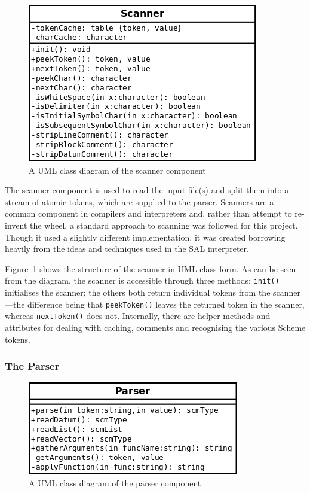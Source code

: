 \begin{figure}
\centering
\includegraphics[width=\textwidth]{scannerUML.png}
\caption{A UML class diagram of the scanner component}
\label{fig:scannerUML}
\end{figure}

The scanner component is used to read the input file(s) and split them into a
stream of atomic tokens, which are supplied to the parser. Scanners are a common
component in compilers and interpreters and, rather than attempt to re-invent
the wheel, a standard approach to scanning was followed for this project.
Though it used a slightly different implementation, it was created borrowing
heavily from the ideas and techniques used in the SAL interpreter\cite{sal}.

Figure~\ref{fig:scannerUML} shows the structure of the scanner in UML class
form. As can be seen from the diagram, the scanner is accessible through three
methods: \texttt{init()} initialises the scanner; the others both return
individual tokens from the scanner---the difference being that
\texttt{peekToken()} leaves the returned token in the scanner, whereas
\texttt{nextToken()} does not. Internally, there are helper methods and
attributes for dealing with caching, comments and recognising the various Scheme
tokens.

\subsubsection{The Parser}

\begin{figure}
\centering
\includegraphics[width=\textwidth]{parserUML.png}
\caption{A UML class diagram of the parser component}
\label{fig:parserUML}
\end{figure}

